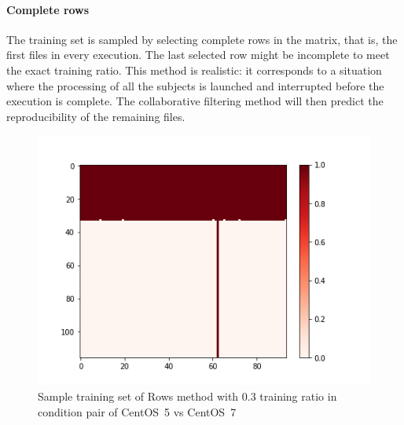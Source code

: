 \documentclass[10pt, conference, compsocconf]{IEEEtran}
\begin{document}
\paragraph{Complete rows} The training set is sampled by selecting complete 
rows in the matrix, that is, the first files in
every execution. The last selected row might be incomplete to meet the
exact training ratio. This method is realistic: it corresponds to a
situation where the processing of all the subjects is launched and
interrupted before the execution is complete. The collaborative 
filtering method will then predict the reproducibility of the
remaining files.
\begin{figure}
  \includegraphics[width=\columnwidth]{figures/5vs7_rows_03_training_plot}
  \caption{Sample training set of Rows method with 0.3 training ratio in condition pair of CentOS~5 vs CentOS~7}
  \label{fig:Sample Training set }
\end{figure}

\end{document}
